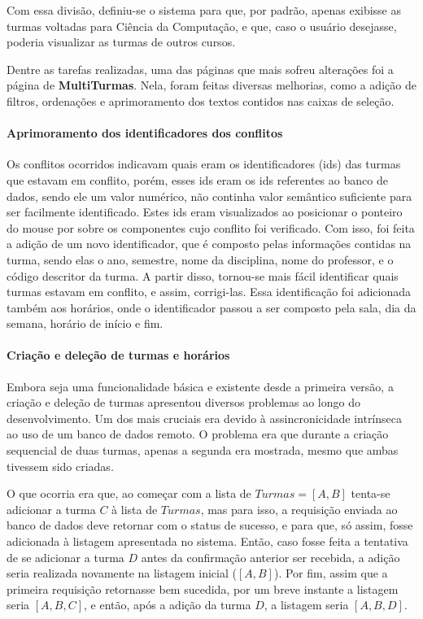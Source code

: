 Com essa divisão, definiu-se o sistema para que, por padrão, apenas exibisse as turmas voltadas para Ciência da Computação, e que, caso o usuário desejasse, poderia visualizar as turmas de outros cursos.


Dentre as tarefas realizadas, uma das páginas que mais sofreu alterações foi a página de \textbf{MultiTurmas}. Nela, foram feitas diversas melhorias, como a adição de filtros, ordenações e aprimoramento dos textos contidos nas caixas de seleção.

\paragraph*{Aprimoramento dos identificadores dos conflitos}

Os conflitos ocorridos indicavam quais eram os identificadores (ids) das turmas que estavam em conflito, porém, esses ids eram os ids referentes ao banco de dados, sendo ele um valor numérico, não continha valor semântico suficiente para ser facilmente identificado. Estes ids eram visualizados ao posicionar o ponteiro do mouse por sobre os componentes cujo conflito foi verificado. Com isso, foi feita a adição de um novo identificador, que é composto pelas informações contidas na turma, sendo elas o ano, semestre, nome da disciplina, nome do professor, e o código descritor da turma. A partir disso, tornou-se mais fácil identificar quais turmas estavam em conflito, e assim, corrigi-las. Essa identificação foi adicionada também aos horários, onde o identificador passou a ser composto pela sala, dia da semana, horário de início e fim.

\paragraph*{Criação e deleção de turmas e horários}

Embora seja uma funcionalidade básica e existente desde a primeira versão, a criação e deleção de turmas apresentou diversos problemas ao longo do desenvolvimento. Um dos mais cruciais era devido à assincronicidade intrínseca ao uso de um banco de dados remoto. O problema era que durante a criação sequencial de duas turmas, apenas a segunda era mostrada, mesmo que ambas tivessem sido criadas.

O que ocorria era que, ao começar com a lista de $Turmas = [A, B]$ tenta-se adicionar a turma $C$ à lista de $Turmas$, mas para isso, a requisição enviada ao banco de dados deve retornar com o status de sucesso, e para que, só assim, fosse adicionada à listagem apresentada no sistema. Então, caso fosse feita a tentativa de se adicionar a turma $D$ antes da confirmação anterior ser recebida, a adição seria realizada novamente na listagem inicial ($[A, B]$). Por fim, assim que a primeira requisição retornasse bem sucedida, por um breve instante a listagem seria $[A, B, C]$, e então, após a adição da turma $D$, a listagem seria $[A, B, D]$.

